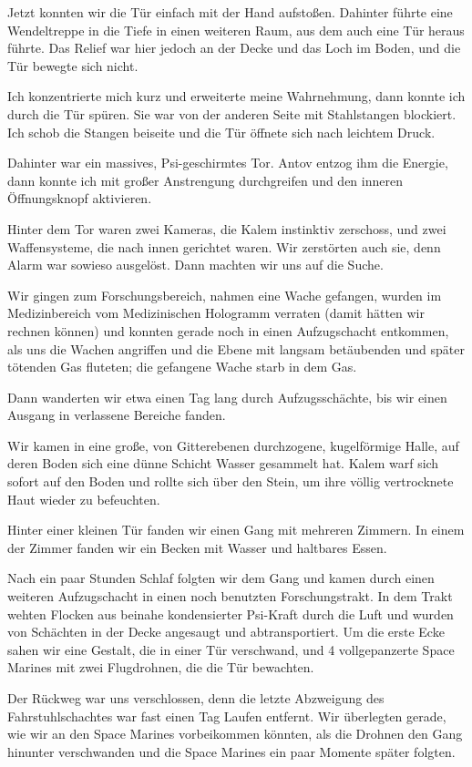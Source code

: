 \documentclass[11pt]{scrartcl}
\begin{document}
Jetzt konnten wir die Tür einfach mit der Hand aufstoßen. Dahinter
führte eine Wendeltreppe in die Tiefe in einen weiteren Raum, aus dem
auch eine Tür heraus führte. Das Relief war hier jedoch an der Decke und
das Loch im Boden, und die Tür bewegte sich nicht.

Ich konzentrierte mich kurz und erweiterte meine Wahrnehmung, dann
konnte ich durch die Tür spüren. Sie war von der anderen Seite mit
Stahlstangen blockiert. Ich schob die Stangen beiseite und die Tür
öffnete sich nach leichtem Druck.

Dahinter war ein massives, Psi-geschirmtes Tor. Antov entzog ihm die
Energie, dann konnte ich mit großer Anstrengung durchgreifen und den
inneren Öffnungsknopf aktivieren.

Hinter dem Tor waren zwei Kameras, die Kalem instinktiv zerschoss, und
zwei Waffensysteme, die nach innen gerichtet waren. Wir zerstörten auch
sie, denn Alarm war sowieso ausgelöst. Dann machten wir uns auf die
Suche.

Wir gingen zum Forschungsbereich, nahmen eine Wache gefangen, wurden im
Medizinbereich vom Medizinischen Hologramm verraten (damit hätten wir
rechnen können) und konnten gerade noch in einen Aufzugschacht
entkommen, als uns die Wachen angriffen und die Ebene mit langsam
betäubenden und später tötenden Gas fluteten; die gefangene Wache starb
in dem Gas.

Dann wanderten wir etwa einen Tag lang durch Aufzugsschächte, bis wir
einen Ausgang in verlassene Bereiche fanden.

Wir kamen in eine große, von Gitterebenen durchzogene, kugelförmige
Halle, auf deren Boden sich eine dünne Schicht Wasser gesammelt hat.
Kalem warf sich sofort auf den Boden und rollte sich über den Stein, um
ihre völlig vertrocknete Haut wieder zu befeuchten.

Hinter einer kleinen Tür fanden wir einen Gang mit mehreren Zimmern. In
einem der Zimmer fanden wir ein Becken mit Wasser und haltbares Essen.

Nach ein paar Stunden Schlaf folgten wir dem Gang und kamen durch einen
weiteren Aufzugschacht in einen noch benutzten Forschungstrakt. In dem
Trakt wehten Flocken aus beinahe kondensierter Psi-Kraft durch die Luft
und wurden von Schächten in der Decke angesaugt und abtransportiert. Um
die erste Ecke sahen wir eine Gestalt, die in einer Tür verschwand, und
4 vollgepanzerte Space Marines mit zwei Flugdrohnen, die die Tür
bewachten.

Der Rückweg war uns verschlossen, denn die letzte Abzweigung des
Fahrstuhlschachtes war fast einen Tag Laufen entfernt. Wir überlegten
gerade, wie wir an den Space Marines vorbeikommen könnten, als die
Drohnen den Gang hinunter verschwanden und die Space Marines ein paar
Momente später folgten.
\end{document}
